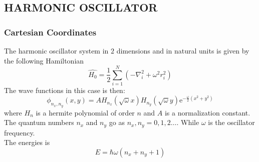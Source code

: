 \documentclass[a4paper, hidelinks, 10pt]{article}
\let\oldsubsection\subsection
\renewcommand{\subsection}[1]{\centering \oldsubsection{{#1}} \justifying}
\newcommand{\me}{\mathrm{e}} %
\begin{document}
\subsection{HARMONIC OSCILLATOR}
\label{sub:harmonic_oscillator}
\subsubsection{Cartesian Coordinates}
\label{ssub:Cartesian Coordinates}
    The harmonic oscillator system in $2$ dimensions and in natural units is
    given by the following Hamiltonian
        \begin{equation}
            \hat{H_0} = \frac{1}{2}\sum^N_{i=1}\left(-\nabla^2_i + \omega^2
            r^2_i\right)
            \label{eq:cartHarmOsc}
        \end{equation}
    The wave functions in this case is then:
        \begin{equation}
            \phi_{n_x,n_y}(x,y) =
            AH_{n_x}(\sqrt{\omega}x)H_{n_y}(\sqrt{\omega}y)\me^{-\frac{\omega}{2}(x^2+y^2)}
            \label{eq:cartUarmOscWavef}
        \end{equation}
    where $H_n$ is a hermite polynomial of order $n$ and $A$ is a normalization
    constant. The quantum numbers $n_x$ and $n_y$ go as $n_x,n_y=0,1,2\dots$.
    While $\omega$ is the oscillator frequency. \\
    The energies is 
        \begin{equation}
            E = \hbar\omega\left(n_x + n_y + 1\right)
            \label{eq:cartHarmOscE}
        \end{equation}
\end{document}
